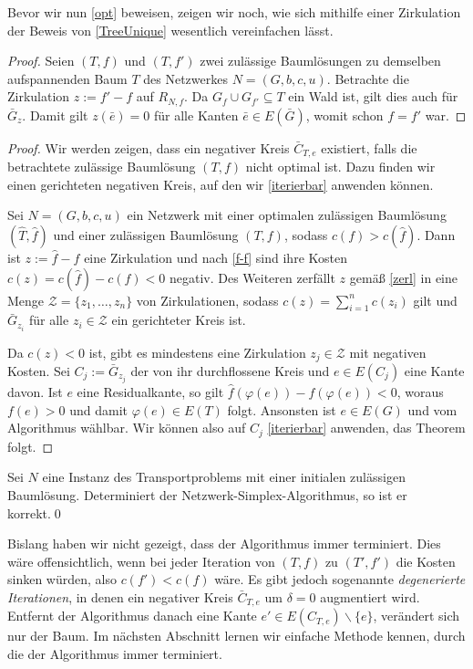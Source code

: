Bevor wir nun \cref{opt} beweisen, zeigen wir noch, wie sich mithilfe einer Zirkulation der Beweis von \cref{TreeUnique} wesentlich vereinfachen lässt. 

\TreeUnique*
\begin{proof}Seien $(T,f)$ und $(T,f')$ zwei zulässige Baumlösungen zu demselben aufspannenden Baum $T$ des Netzwerkes $N=(G,b,c,u)$. Betrachte die Zirkulation $z:=f'-f$ auf $R_{N,f}$. Da $G_f\cup G_{f'}\subseteq T$ ein Wald ist, gilt dies auch für $\bar{G}_z$. Damit gilt $z(\bar{e}) = 0$ für alle Kanten $\bar{e}\in E(\bar{G})$, womit schon $f=f'$ war.\end{proof}

\Opt*
\begin{proof}Wir werden zeigen, dass ein negativer Kreis $\bar{C}_{T,e}$ existiert, falls die betrachtete zulässige Baumlösung $(T,f)$ nicht optimal ist. Dazu finden wir einen gerichteten negativen Kreis, auf den wir \cref{iterierbar} anwenden können.
	
Sei $N=(G,b,c,u)$ ein Netzwerk mit einer optimalen zulässigen Baumlösung $(\hat{T},\hat{f})$ und einer zulässigen Baumlösung $(T,f)$, sodass $c(f)>c(\hat{f})$. Dann ist $z:=\hat{f}-f$ eine Zirkulation und nach \cref{f-f} sind ihre Kosten $c(z)=c(\hat{f})-c(f)<0$ negativ. Des Weiteren zerfällt $z$ gemäß \cref{zerl} in eine Menge $\mathscr{Z}=\{z_1,\ldots,z_n\}$ von Zirkulationen, sodass $c(z)=\sum_{i=1}^{n} c(z_i)$ gilt und $\bar{G}_{z_i}$ für alle $z_i\in\mathscr{Z}$ ein gerichteter Kreis ist.  

Da $c(z)<0$ ist, gibt es mindestens eine Zirkulation $z_j\in\mathscr{Z}$ mit negativen Kosten. Sei $C_j:=\bar{G}_{z_j}$ der von ihr durchflossene Kreis und $e\in E(C_j)$ eine Kante davon. Ist $e$ eine Residualkante, so gilt $\hat{f}(\varphi(e))-f(\varphi(e))<0$, woraus $f(e)>0$ und damit $\varphi(e)\in E(T)$ folgt. Ansonsten ist $e\in E(G)$ und vom Algorithmus wählbar. Wir können also auf $C_j$ \cref{iterierbar} anwenden, das Theorem folgt.\end{proof}

\begin{kor}\label{korrekt}Sei $N$ eine Instanz des Transportproblems mit einer initialen zulässigen Baumlösung. Determiniert der Netzwerk-Simplex-Algorithmus, so ist er korrekt.\qed\end{kor}

Bislang haben wir nicht gezeigt, dass der Algorithmus immer terminiert. Dies wäre offensichtlich, wenn bei jeder Iteration von $(T,f)$ zu $(T',f')$ die Kosten sinken würden, also $c(f')<c(f)$ wäre. Es gibt jedoch sogenannte \emph{degenerierte Iterationen}, in denen ein negativer Kreis $\bar{C}_{T,e}$ um $\delta=0$ augmentiert wird. Entfernt der Algorithmus danach eine Kante $e'\in E(C_{T,e})\backslash\{e\}$, verändert sich nur der Baum. Im nächsten Abschnitt lernen wir einfache Methode kennen, durch die der Algorithmus immer terminiert.

